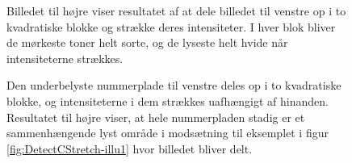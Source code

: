 \begin{figure}[htbp]
  \centering
  \begin{minipage}[b]{5 cm}
  \end{minipage}
  \begin{minipage}[b]{5 cm}
  \end{minipage}
  \caption{Billedet til højre viser resultatet af at dele billedet til venstre op i to kvadratiske blokke og strække deres intensiteter. I hver blok bliver de mørkeste toner helt sorte, og de lyseste helt hvide når intensiteterne strækkes.}
  \label{fig:DetectCStretch-illu1}
\end{figure}

\begin{figure}[htbp]
  \centering
  \begin{minipage}[b]{5 cm}
  \end{minipage}
  \begin{minipage}[b]{5 cm}
  \end{minipage}
  \caption{Den underbelyste nummerplade til venstre deles op i to kvadratiske blokke, og intensiteterne i dem strækkes uafhængigt af hinanden. Resultatet til højre viser, at hele nummerpladen stadig er et sammenhængende lyst område i modsætning til eksemplet i figur \vref{fig:DetectCStretch-illu1} hvor billedet bliver delt.}
  \label{fig:DetectCStretch-illu2}
\end{figure}

